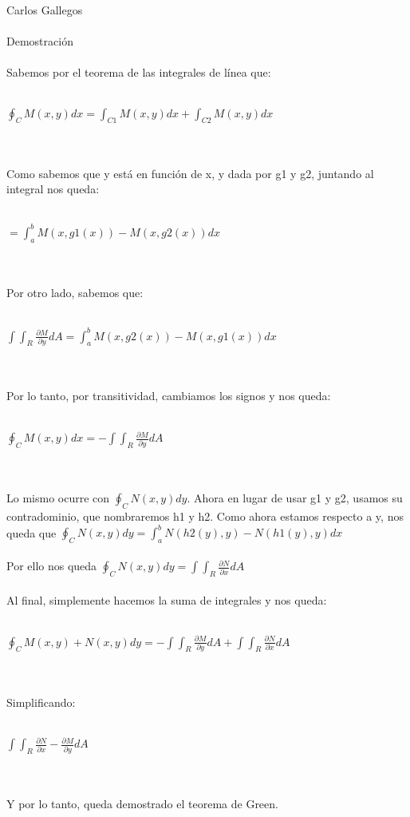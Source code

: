 \documentclass[a4paper,10pt]{article}
\title{}
\author{}
\date{}
\begin{document}
\maketitle
Carlos Gallegos\\\\
Demostración\\\\
Sabemos por el teorema de las integrales de línea que: \\\\
\centerline{$\oint_C M(x,y) dx = \int_{C1} M(x,y) dx + \int_{C2} M(x,y) dx$}\\\\
Como sabemos que y está en función de x, y dada por g1 y g2, juntando al integral nos queda:\\\\
\centerline{$= \int_a^b M(x,g1(x)) - M(x,g2(x)) dx$}\\\\
Por otro lado, sabemos que:\\\\
\centerline{$\int\int_R \frac{\partial M}{\partial y} dA = \int_a^b M(x,g2(x)) - M(x,g1(x)) dx$}\\\\
Por lo tanto, por transitividad, cambiamos los signos y nos queda:\\\\
\centerline{$\oint_C M(x,y) dx = - \int\int_R \frac{\partial M}{\partial y} dA$}\\\\
Lo mismo ocurre con $\oint_C N(x,y) dy$. Ahora en lugar de usar g1 y g2, usamos su contradominio, que nombraremos h1 y h2. Como ahora estamos respecto a y, nos queda que $\oint_C N(x,y) dy = \int_a^b N(h2(y),y) - N(h1(y),y) dx$\\\\ 
Por ello nos queda $\oint_C N(x,y) dy = \int\int_R \frac{\partial N}{\partial x} dA$\\\\
Al final, simplemente hacemos la suma de integrales y nos queda:\\\\
\centerline{$\oint_C M(x,y) + N(x,y) dy = - \int\int_R \frac{\partial M}{\partial y} dA + \int\int_R \frac{\partial N}{\partial x} dA$}\\\\
Simplificando:\\\\
\centerline{$\int\int_R \frac{\partial N}{\partial x}-\frac{\partial M}{\partial y} dA$}\\\\
Y por lo tanto, queda demostrado el teorema de Green.
\end{document}
